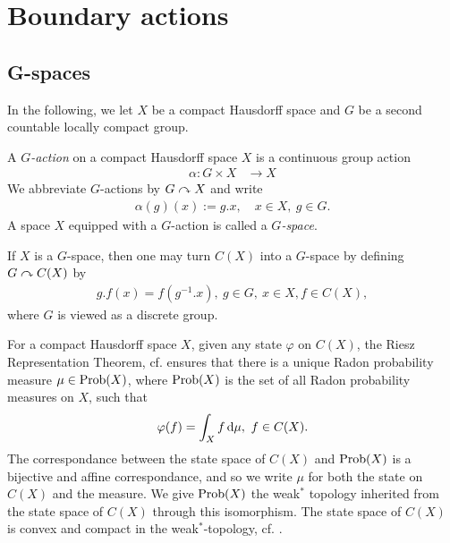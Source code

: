 \chapter{Boundary actions}
\section{G-spaces}
In the following, we let $X$ be a compact Hausdorff space and $G$ be a second countable locally compact group.


\begin{definition}\label{group action compact haus}
A \emph{$G$-action} on a compact Hausdorff space $X$ is a continuous group action 
\begin{align*}
\alpha \colon G  \times X  &\to X
\end{align*}
We abbreviate $G$-actions by $G \curvearrowright X$ and write 
\begin{align*}
\alpha(g)(x):=g.x, \quad x \in X , \ g \in G.
\end{align*} 
A space $X$ equipped with a $G$-action is called a \emph{$G$-space}.
\end{definition}

\begin{remark}
If $X$ is a $G$-space, then one may turn $C(X)$ into a $G$-space by defining $G \curvearrowright C(X)$ by
\begin{align*}
g.f(x)=f(g^{-1}.x), \ g \in G, \ x \in X, f \in C(X),
\end{align*}
where $G$ is viewed as a discrete group.
\end{remark}

For a compact Hausdorff space $X$, given any state $\varphi$ on $C(X)$, the Riesz Representation Theorem, cf. \cite[Theorem 7.2][212]{folland2013real} ensures that there is a unique Radon probability measure $\mu \in \operatorname{Prob}(X)$, where $\operatorname{Prob}(X)$ is the set of all Radon probability measures on $X$, such that 
\begin{align*}
\varphi(f)= \int_{X}f \mathop{}\!\mathrm{d} \mu, \ f \in C(X).
\end{align*}
The correspondance between the state space of $C(X)$ and $\operatorname{Prob}(X)$ is a bijective and affine correspondance, and so we write $\mu$ for both the state on $C(X)$ and the measure. We give $\operatorname{Prob}(X)$ the weak$^*$ topology inherited from the state space of $C(X)$ through this isomorphism. The state space of $C(X)$ is convex and compact in the weak$^*$-topology, cf. \cite[Proposotition 13.8][81]{zhu}. 

